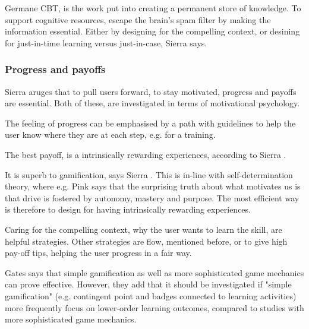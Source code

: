 Germane CBT, is the work put into creating a permanent store of knowledge. To support cognitive resources, escape the brain's spam filter by making the information essential. Either by designing for the compelling context, or desining for just-in-time learning versus just-in-case, Sierra says. \cite{sierra}

\subsubsection{Progress and payoffs}

Sierra aruges that to pull users forward, to stay motivated, progress and payoffs are essential. Both of these, are investigated in terms of motivational psychology.

The feeling of progress can be emphasised by a path with guidelines to help the user know where they are at each step, e.g. for a training.

The best payoff, is a intrinsically rewarding experiences, according to Sierra \cite{sierra}.

It is superb to gamification, says Sierra \cite{sierra}. This is in-line with self-determination theory, where e.g. Pink \cite{pink} says that the surprising truth about what motivates us is that drive is fostered by autonomy, mastery and purpose. The most efficient way is therefore to design for having intrinsically rewarding experiences.

Caring for the compelling context, why the user wants to learn the skill, are helpful strategies. Other strategies are flow, mentioned before, or to give high pay-off tips, helping the user progress in a fair way.

Gates \cite{sierra} says that simple gamification as well as more sophisticated game mechanics can prove effective. However, they add that it should be investigated if "simple gamification" (e.g. contingent point and badges connected to learning activities) more frequently focus on lower-order learning outcomes, compared to studies with more sophisticated game mechanics.
